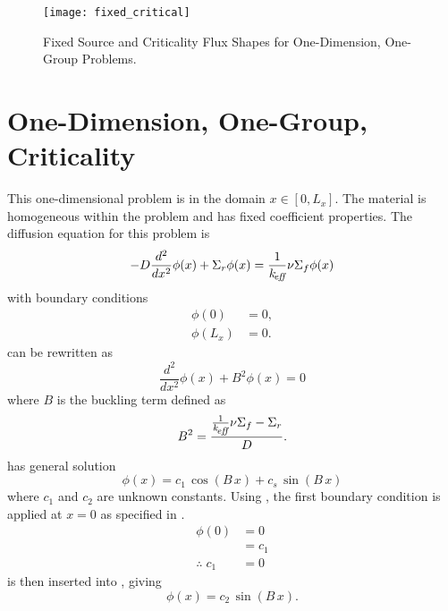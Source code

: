   \begin{figure}
    \centering
    \texttt{[image: fixed\_critical]}
    \caption{Fixed Source and Criticality Flux Shapes for One-Dimension,
      One-Group Problems.}
    \label{fig:fixed_critical}
  \end{figure}
  
\section{One-Dimension, One-Group, Criticality} 
  \label{sec:deriv_1d1g}
  This one-dimensional problem is in the domain $x \in [0,L_x]$. The material
  is homogeneous within the problem and has fixed coefficient properties. The
  diffusion equation for this problem is
  \begin{equation}
    \label{eq:1d1g}
    -D \frac{d^2}{dx^2} \phi(x) + \Sigma_r \phi(x) = 
      \frac{1}{k_{\!\mbox{\scriptsize \em eff}}} \nu \Sigma_f \phi(x)
  \end{equation}
  with boundary conditions
  \begin{align}
    \label{eq:1d1g_bc1}
    \phi(0) &= 0 ,\\
    \label{eq:1d1g_bc2}
    \phi(L_x) &= 0.
  \end{align}
   can be rewritten as
  \begin{equation}
    \label{eq:1d1g_buckle}
    \frac{d^2}{dx^2} \phi(x) + B^2 \phi(x) = 0
  \end{equation}
  where $B$ is the buckling term defined as
  \begin{equation}
    \label{eq:1d1g_b2}
    B^2 = \frac{\frac{1}{k_{\!\mbox{\scriptsize \em eff}}} \nu \Sigma_f - \Sigma_r}{D}.
  \end{equation}
   has general solution 
  \begin{equation}
    \label{eq:1d1g_general}
    \phi(x) = c_1 \, \cos(B \, x) + c_s \, \sin(B \, x)
  \end{equation}
  where $c_1$ and $c_2$ are unknown constants.
  Using , the first boundary condition is applied at $x=0$
  as specified in .
  \begin{align}
    \phi(0) &= 0 \\
    &= c_1 \\
    \label{eq:1d1g_c1}
    \therefore \; c_1 &= 0
  \end{align}
   is then inserted into , giving
  \begin{equation}
    \label{eq:1d1g_sin}
    \phi(x) = c_2 \, \sin(B \, x).
  \end{equation}
